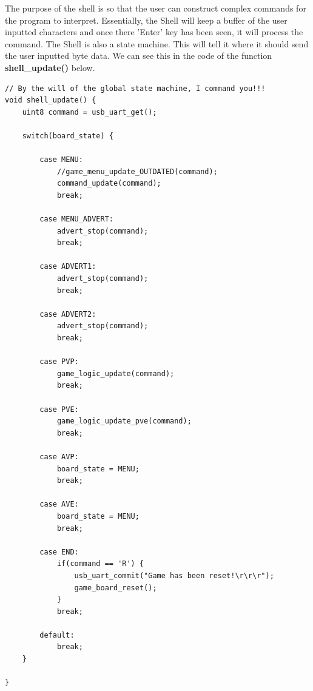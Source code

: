 \documentclass[a4paper, 12pt]{article}
\begin{document}
    The purpose of the shell is so that the user can construct complex commands
    for the program to interpret. Essentially, the Shell will keep a buffer of
    the user inputted characters and once there 'Enter' key has been seen, it
    will process the command. The Shell is also a state machine. This will tell
    it where it should send the user inputted byte data. We can see this in
    the code of the function \textbf{shell\_update()} below.

    \begin{verbatim}
// By the will of the global state machine, I command you!!!
void shell_update() {
    uint8 command = usb_uart_get();
    
    switch(board_state) {
            
        case MENU: 
            //game_menu_update_OUTDATED(command);
            command_update(command);
            break;
            
        case MENU_ADVERT:
            advert_stop(command);
            break;
            
        case ADVERT1:
            advert_stop(command);
            break;
            
        case ADVERT2:
            advert_stop(command);
            break;
        
        case PVP:
            game_logic_update(command);            
            break;
        
        case PVE:
            game_logic_update_pve(command);
            break;
        
        case AVP:
            board_state = MENU;
            break;
        
        case AVE:
            board_state = MENU;
            break;
            
        case END:
            if(command == 'R') {
                usb_uart_commit("Game has been reset!\r\r\r");
                game_board_reset();
            }
            break;           
        
        default: 
            break;
    }
    
}
    \end{verbatim}
\end{document}
